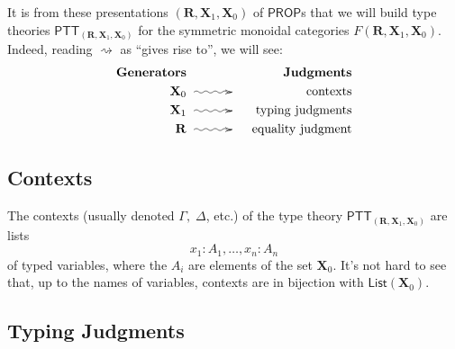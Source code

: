 \documentclass[pra,floatfix,
amsmath,superscriptaddress, 12pt]{article}
\theoremstyle{definition}
\begin{document}
It is from these presentations $(\mathbf{R},\mathbf{X}_1,\mathbf{X}_0)$ of $\mathsf{PROP}$s that we will build type theories $\mathsf{PTT}_{(\mathbf{R},\mathbf{X}_1,\mathbf{X}_0)}$ for the symmetric monoidal categories $F(\mathbf{R},\mathbf{X}_1,\mathbf{X}_0)$. Indeed, reading $\rightsquigarrow$ as ``gives rise to'', we will see:
    \begin{eqnarray*}
      \mathbf{Generators}
        &
            &
            \mathbf{Judgments}
                \\
      \mathbf{X}_0
        & \xymatrix@C=3em{{}\ar@{~>}[r]&{}}
            & \mathrm{contexts} \\
      \mathbf{X}_1 & \xymatrix@C=3em{{}\ar@{~>}[r]&{}} & \mathrm{typing \ judgments} \\
      \mathbf{R}   & \xymatrix@C=3em{{}\ar@{~>}[r]&{}} & \mathrm{equality \ judgment}
    \end{eqnarray*}

\subsection{Contexts}

The contexts (usually denoted $\Gamma,\;\Delta$, etc.) of the type theory $\mathsf{PTT}_{(\mathbf{R},\mathbf{X}_1,\mathbf{X}_0)}$  are lists
    \[
        x_{1}:A_{1},\dots,x_{n}:A_{n}
    \]
of typed variables, where the $A_i$ are elements of the set $\mathbf{X}_{0}$. It's not hard to see that, up to the names of variables, contexts are in bijection with $\mathsf{List}(\mathbf{X}_0)$.

\subsection{Typing Judgments}
\end{document}
